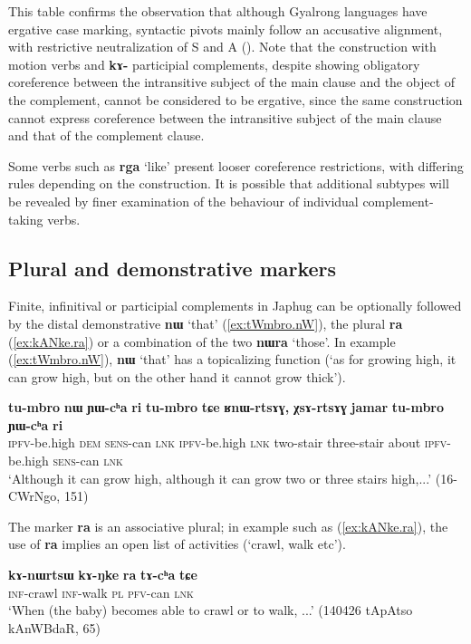\documentclass[oneside,a4paper,11pt]{article}
\newcommand{\ipa}[1]{\textbf{\phon#1}} %
\newcommand{\jpg}[2]{\ipa{#1} `#2'} %
\begin{document}
This table confirms the observation that although Gyalrong languages have ergative case marking, syntactic pivots mainly follow an accusative alignment, with restrictive neutralization of S and A (\citealt{jackson03caodeng, jacques16relatives}). Note that the construction with motion verbs and \ipa{kɤ-} participial complements, despite showing obligatory coreference between the intransitive subject of the main clause and the object of the complement, cannot be considered to be ergative, since the same construction cannot express coreference between the intransitive subject of the main clause and that of the complement clause.

Some verbs such as \jpg{rga}{like} present looser coreference restrictions, with differing rules depending on the construction. It is possible that additional subtypes will be revealed by finer examination of the behaviour of individual complement-taking verbs.

 \subsection{Plural and demonstrative markers} \label{sec:demonstratives}
Finite, infinitival or participial complements in Japhug can be optionally followed by the distal demonstrative \jpg{nɯ}{that} (\ref{ex:tWmbro.nW}), the plural \ipa{ra} (\ref{ex:kANke.ra}) or a combination of the two \jpg{nɯra}{those}. In example (\ref{ex:tWmbro.nW}), \jpg{nɯ}{that}  has a topicalizing function (`as for growing high, it can grow high, but on the other hand it cannot grow thick').

 \begin{exe}
\ex \label{ex:tWmbro.nW}
\gll 
\ipa{tu-mbro} 	\ipa{nɯ} 	\ipa{ɲɯ-cʰa} 	\ipa{ri} 	\ipa{tu-mbro} 	\ipa{tɕe} 	\ipa{ʁnɯ-rtsɤɣ,} 	\ipa{χsɤ-rtsɤɣ} 	\ipa{jamar} 	\ipa{tu-mbro} 	\ipa{ɲɯ-cʰa} 	\ipa{ri}  \\
\textsc{ipfv}-be.high \textsc{dem} \textsc{sens}-can \textsc{lnk} \textsc{ipfv}-be.high \textsc{lnk} two-stair three-stair about \textsc{ipfv}-be.high  \textsc{sens}-can \textsc{lnk} \\
\glt `Although it can grow high, although it can grow two or three stairs high,...' (16-CWrNgo, 151)
\end{exe}
 
The marker \ipa{ra} is an associative plural; in example such as (\ref{ex:kANke.ra}), the use of \ipa{ra} implies an open list of activities (`crawl, walk etc'). 
 
 \begin{exe}
\ex \label{ex:kANke.ra}
\gll   \ipa{kɤ-nɯrtsɯ} 	\ipa{kɤ-ŋke} 	\ipa{ra} 	\ipa{tɤ-cʰa} 	\ipa{tɕe}   \\
  \textsc{inf}-crawl   \textsc{inf}-walk \textsc{pl} \textsc{pfv}-can \textsc{lnk} \\
\glt `When (the baby) becomes able to crawl or to walk, ...'  (140426 tApAtso kAnWBdaR, 65)
\end{exe}
\end{document}
